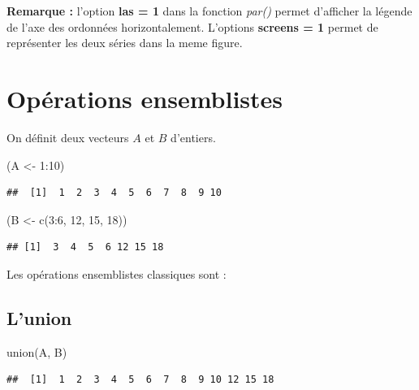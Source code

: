 \documentclass[
]{book}
\newenvironment{Shaded}{\begin{snugshade}}{\end{snugshade}}
\newcommand{\DecValTok}[1]{\textcolor[rgb]{0.00,0.00,0.81}{#1}}
\newcommand{\FunctionTok}[1]{\textcolor[rgb]{0.00,0.00,0.00}{#1}}
\newcommand{\NormalTok}[1]{#1}
\newcommand{\OtherTok}[1]{\textcolor[rgb]{0.56,0.35,0.01}{#1}}
\newcommand{\SpecialCharTok}[1]{\textcolor[rgb]{0.00,0.00,0.00}{#1}}
\theoremstyle{definition}
\theoremstyle{definition}
\theoremstyle{definition}
\theoremstyle{definition}
\theoremstyle{remark}
\begin{document}
\textbf{Remarque :} l'option \textbf{las = 1} dans la fonction \emph{par()} permet d'afficher la légende de l'axe des ordonnées horizontalement. L'options \textbf{screens = 1} permet de représenter les deux séries dans la meme figure.

\hypertarget{opuxe9rations-ensemblistes}{%
\section{Opérations ensemblistes}\label{opuxe9rations-ensemblistes}}

On définit deux vecteurs \(A\) et \(B\) d'entiers.

\begin{Shaded}
\begin{Highlighting}[]
\NormalTok{(A }\OtherTok{\textless{}{-}} \DecValTok{1}\SpecialCharTok{:}\DecValTok{10}\NormalTok{)}
\end{Highlighting}
\end{Shaded}

\begin{verbatim}
##  [1]  1  2  3  4  5  6  7  8  9 10
\end{verbatim}

\begin{Shaded}
\begin{Highlighting}[]
\NormalTok{(B }\OtherTok{\textless{}{-}} \FunctionTok{c}\NormalTok{(}\DecValTok{3}\SpecialCharTok{:}\DecValTok{6}\NormalTok{, }\DecValTok{12}\NormalTok{, }\DecValTok{15}\NormalTok{, }\DecValTok{18}\NormalTok{))}
\end{Highlighting}
\end{Shaded}

\begin{verbatim}
## [1]  3  4  5  6 12 15 18
\end{verbatim}

Les opérations ensemblistes classiques sont :

\hypertarget{lunion}{%
\subsection{L'union}\label{lunion}}

\begin{Shaded}
\begin{Highlighting}[]
\FunctionTok{union}\NormalTok{(A, B)}
\end{Highlighting}
\end{Shaded}

\begin{verbatim}
##  [1]  1  2  3  4  5  6  7  8  9 10 12 15 18
\end{verbatim}
\end{document}
